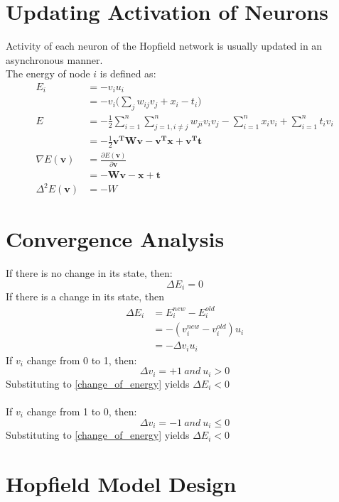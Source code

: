 \section{Updating Activation of Neurons}
Activity of each neuron of the Hopfield network is usually updated in an asynchronous manner. \\
The energy of node $i$ is defined as:
\begin{equation*}
\begin{split}
E_i &= -v_i u_i \\
&= - v_i \Big(\sum_{j} w_{ij} v_j + x_i - t_i \Big) \\
E &= -\frac{1}{2} \sum_{i=1}^{n} \sum_{j=1, i\ne j}^{n} w_{ji} v_{i} v_{j} - \sum_{i=1}^{n} x_i v_i + \sum_{i=1}^{n} t_i v_i \\
&= -\frac{1}{2} \mathbf{v^{T} W v - v^{T} x + v^{T}t} \\
\nabla E(\mathbf{v}) &= \frac{\partial E(\mathbf{v})}{\partial \mathbf{v}} \\
&= \mathbf{- Wv - x + t} \\
\Delta^{2} E(\mathbf{v}) &= - W
\end{split}
\end{equation*}

\section{Convergence Analysis}
If there is no change in its state, then:
$$\Delta E_i = 0$$
If there is a change in its state, then
\begin{equation}
\begin{split}
\Delta E_i &= E_i^{new} - E_i^{old} \\
&= - (v_i^{new} - v_i^{old}) u_i \\
&= - \Delta v_i u_i 
\end{split}
\label{change_of_energy}
\end{equation}
If $v_i$ change from 0 to 1, then:
$$\Delta v_i = +1\ and\ u_i > 0$$
Substituting to \ref{change_of_energy} yields $\Delta E_i < 0$ \\ \\
If $v_i$ change from 1 to 0, then:
$$\Delta v_i = -1\ and\ u_i \le 0$$
Substituting to \ref{change_of_energy} yields $\Delta E_i < 0$

\section{Hopfield Model Design}


